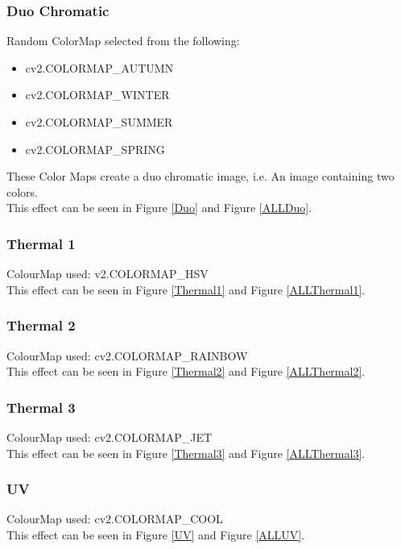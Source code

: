 \documentclass[a4paper,10pt]{report}
\begin{document}
	\subsubsection{Duo Chromatic}
	Random ColorMap selected from the following:
	\begin{itemize}
		\item cv2.COLORMAP\_AUTUMN
		\item cv2.COLORMAP\_WINTER
		\item cv2.COLORMAP\_SUMMER
		\item cv2.COLORMAP\_SPRING
	\end{itemize}
	These Color Maps create a duo chromatic image, i.e. An image containing two colors.\\
	This effect can be seen in Figure \ref{Duo} and Figure \ref{ALLDuo}.
	\subsubsection{Thermal 1}
	ColourMap used: v2.COLORMAP\_HSV\\
	This effect can be seen in Figure \ref{Thermal1} and Figure \ref{ALLThermal1}.
	\subsubsection{Thermal 2}
	ColourMap used: cv2.COLORMAP\_RAINBOW\\
	This effect can be seen in Figure \ref{Thermal2} and Figure \ref{ALLThermal2}.
	\subsubsection{Thermal 3}
	ColourMap used: cv2.COLORMAP\_JET\\
	This effect can be seen in Figure \ref{Thermal3} and Figure \ref{ALLThermal3}.
	\subsubsection{UV}
	ColourMap used: cv2.COLORMAP\_COOL\\
	This effect can be seen in Figure \ref{UV} and Figure \ref{ALLUV}.
	
\end{document}
